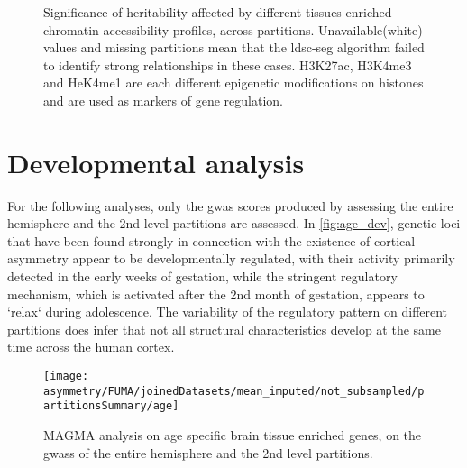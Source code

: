 \begin{figure}[H]
	\begin{adjustwidth}{-3cm}{-3cm}
	\centering
	
	\caption[LDSC-SEG assessment on variable chromatin accessibility]{Significance of heritability affected by different tissues enriched chromatin accessibility profiles, across partitions. Unavailable(white) values and missing partitions mean that the \ac{ldsc-seg} algorithm failed to identify strong relationships in these cases. H3K27ac, H3K4me3 and HeK4me1 are each different epigenetic modifications on histones and are used as markers of gene regulation.}
	\label{fig:ldsc-seg-chromatin}
	\end{adjustwidth}
\end{figure}
\section{Developmental analysis}
For the following analyses, only the \ac{gwas} scores produced by assessing the entire hemisphere and the 2nd level partitions are assessed. In \autoref{fig:age_dev}, genetic loci that have been found strongly in connection with the existence of cortical asymmetry appear to be developmentally regulated, with their activity primarily detected in the early weeks of gestation, while the stringent regulatory mechanism, which is activated after the 2nd month of gestation, appears to `relax` during adolescence. The variability of the regulatory pattern on different partitions does infer that not all structural characteristics develop at the same time across the human cortex.

\begin{figure}[H]
	\begin{adjustwidth}{-3cm}{-3cm}
	\centering
	\texttt{[image: asymmetry/FUMA/joinedDatasets/mean\_imputed/not\_subsampled/partitionsSummary/age]}
	\caption[Brain tissue specific age enriched genes analysis]{MAGMA analysis on age specific brain tissue enriched genes, on the \acp{gwas} of the entire hemisphere and the 2nd level partitions.}
	\label{fig:age_dev}
	\end{adjustwidth}
\end{figure}


